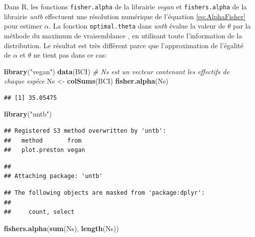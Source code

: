 \documentclass[
  11pt,
  french,
  a4paper,
  extrafontsizes,onecolumn,openright
  ]{memoir}
\newenvironment{Shaded}{\begin{snugshade}}{\end{snugshade}}
\newcommand{\CommentTok}[1]{\textcolor[rgb]{0.56,0.35,0.01}{\textit{#1}}}
\newcommand{\KeywordTok}[1]{\textcolor[rgb]{0.13,0.29,0.53}{\textbf{#1}}}
\newcommand{\NormalTok}[1]{#1}
\newcommand{\StringTok}[1]{\textcolor[rgb]{0.31,0.60,0.02}{#1}}
\begin{document}
Dans R, les fonctions \texttt{fisher.alpha} de la librairie \emph{vegan} et \texttt{fishers.alpha} de la librairie \emph{untb} \autocite{Hankin2007} effectuent une résolution numérique de l'équation \eqref{eq:AlphaFisher} pour estimer \(\alpha\).
La fonction \texttt{optimal.theta} dans \emph{untb} évalue la valeur de \(\theta\) par la méthode du maximum de vraisemblance \autocite[page 122]{Hubbell2001}, en utilisant toute l'information de la distribution.
Le résultat est très différent parce que l'approximation de l'égalité de \(\alpha\) et \(\theta\) ne tient pas dans ce cas:

\scriptsize

\begin{Shaded}
\begin{Highlighting}[]
\KeywordTok{library}\NormalTok{(}\StringTok{"vegan"}\NormalTok{)}
\KeywordTok{data}\NormalTok{(BCI)}
\CommentTok{# Ns est un vecteur contenant les effectifs de chaque espèce}
\NormalTok{Ns <-}\StringTok{ }\KeywordTok{colSums}\NormalTok{(BCI)}
\KeywordTok{fisher.alpha}\NormalTok{(Ns)}
\end{Highlighting}
\end{Shaded}

\begin{verbatim}
## [1] 35.05475
\end{verbatim}

\begin{Shaded}
\begin{Highlighting}[]
\KeywordTok{library}\NormalTok{(}\StringTok{"untb"}\NormalTok{)}
\end{Highlighting}
\end{Shaded}

\begin{verbatim}
## Registered S3 method overwritten by 'untb':
##   method       from 
##   plot.preston vegan
\end{verbatim}

\begin{verbatim}
## 
## Attaching package: 'untb'
\end{verbatim}

\begin{verbatim}
## The following objects are masked from 'package:dplyr':
## 
##     count, select
\end{verbatim}

\begin{Shaded}
\begin{Highlighting}[]
\KeywordTok{fishers.alpha}\NormalTok{(}\KeywordTok{sum}\NormalTok{(Ns), }\KeywordTok{length}\NormalTok{(Ns))}
\end{Highlighting}
\end{Shaded}
\end{document}
